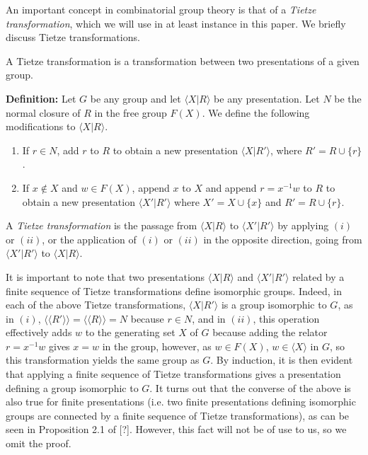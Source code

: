\documentclass[12pt]{article}
\newcommand{\vs}{\vskip10pt}
\begin{document}
	An important concept in combinatorial group theory is that of a \textit{Tietze transformation}, which we will use in at least instance in this paper. We briefly discuss Tietze transformations. 
	
	\vs 
	
	A Tietze transformation is a transformation between two presentations of a given group. 
	
	\vs
	
	\textbf{Definition: } Let $G$ be any group and let $\langle X \vert R \rangle $ be any presentation. Let $N$ be the normal closure of $R$ in the free group $F(X)$. We define the following modifications to $\langle X \vert R \rangle $. 
	
	\begin{enumerate}[label = (\roman*)]
		\item If $r \in N$, add $r$ to $R$ to obtain a new presentation $\langle X \vert R' \rangle$, where $R' = R \cup \{r\}$. 
		\item If $x \notin X$ and $w \in F(X)$, append $x$ to $X$ and append $r = x^{-1}w$ to $R$ to obtain a new presentation $\langle X' \vert R' \rangle$ where $X' = X \cup \{x\}$ and $R' = R \cup \{r\}$. 
	\end{enumerate}

	A \textit{Tietze transformation} is the passage from $\langle X \vert R \rangle$ to $\langle X' \vert R' \rangle$ by applying $(i)$ or $(ii)$, or the application of $(i)$ or $(ii)$ in the opposite direction, going from $\langle X' \vert R' \rangle$ to $\langle X \vert R \rangle$.
	
	\vs

	It is important to note that two presentations $\langle X \vert R \rangle$ and $\langle X' \vert R' \rangle$ related by a finite sequence of Tietze transformations define isomorphic groups. Indeed, in each of the above Tietze transformations, $\langle X \vert R' \rangle$ is a group isomorphic to $G$, as in $(i)$, $\langle \langle R' \rangle \rangle = \langle \langle R \rangle \rangle = N$ because $r \in N$, and in $(ii)$, this operation effectively adds $w$ to the generating set $X$ of $G$ because adding the relator $r = x^{-1}w$ gives $x = w$ in the group, however, as $w \in F(X)$, $w \in \langle X \rangle$ in $G$, so this transformation yields the same group as $G$. By induction, it is then evident that applying a finite sequence of Tietze transformations gives a presentation defining a group isomorphic to $G$. It turns out that the converse of the above is also true for finite presentations (i.e. two finite presentations defining isomorphic groups are connected by a finite sequence of Tietze transformations), as can be seen in Proposition 2.1 of [?]. However, this fact will not be of use to us, so we omit the proof. 
	
\end{document}
